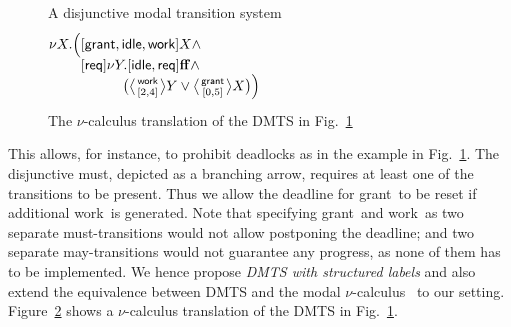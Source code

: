\documentclass[twocolumn]{svjour3-dummy}
\newcommand*\req{\textsf{req}}
\newcommand*\grant{\textsf{grant}}
\newcommand*\idle{\textsf{idle}}
\newcommand*\work{\textsf{work}}
\newcommand*\datop[2]{\genfrac{}{}{0pt}{0}{#1}{#2}}
\newcommand*\tatop[2]{\genfrac{}{}{0pt}{1}{#1}{#2}}
\newcommand*\fff{\mathbf{ff}}
\begin{document}
\begin{figure}
  \centering
  \caption{\label{fi:quantspecex1}
    A disjunctive modal transition system}
\end{figure}

\begin{figure}\centering
  $\begin{aligned}
    \nu X.\smash{ \Big(} &[ \grant, \idle, \work] X\land \\
    &[ \req] \nu Y. [ \idle, \req] \fff \land\\
    &\hspace{3em} \smash{ \big( \big\langle \tatop{ \work}{[ 2,
        4]}\big\rangle Y\lor \big\langle \tatop{ \grant}{[ 0,
        5]}\big\rangle X\big)\Big)}
  \end{aligned}$
  \caption{\label{fi:quantspecex}
    The $\nu$-calculus translation of the DMTS in
    Fig.~\ref{fi:quantspecex1}}
\end{figure}

This allows, for instance, to prohibit deadlocks as in the example in
Fig.~\ref{fi:quantspecex1}. The disjunctive must, depicted as a
branching arrow, requires at least one of the transitions to be
present. Thus we allow the deadline for \grant\ to be reset if
additional \work\ is generated. Note that specifying \grant\ and
\work\ as two separate must-transitions would not allow postponing the
deadline; and two separate may-transitions would not guarantee any
progress, as none of them has to be implemented. We hence propose
\emph{DMTS with structured labels} and also extend the equivalence
between DMTS and the modal
$\nu$-calculus~\cite{DBLP:conf/concur/BenesDFKL13,
  DBLP:conf/ictac/FahrenbergLT14} to our setting.
Figure~\ref{fi:quantspecex} shows a $\nu$-calculus translation of the
DMTS in Fig.~\ref{fi:quantspecex1}.
\end{document}
